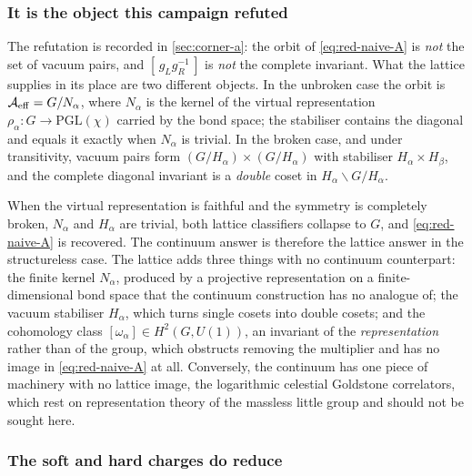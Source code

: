 \subsubsection*{It is the object this campaign refuted}

The refutation is recorded in \cref{sec:corner-a}: the orbit of
\eqref{eq:red-naive-A} is \emph{not} the set of vacuum pairs, and
$[\,g_Lg_R^{-1}\,]$ is \emph{not} the complete invariant. What the lattice
supplies in its place are two different objects. In the unbroken case the orbit
is $\mathcal{A}_{\mathrm{eff}}=G/N_\alpha$, where $N_\alpha$ is the kernel of the virtual
representation $\rho_\alpha\colon G\to\mathrm{PGL}(\chi)$ carried by the bond
space; the stabiliser contains the diagonal and equals it exactly when
$N_\alpha$ is trivial. In the broken case, and under transitivity, vacuum pairs
form $(G/H_\alpha)\times(G/H_\alpha)$ with stabiliser $H_\alpha\times H_\beta$,
and the complete diagonal invariant is a \emph{double} coset in
$H_\alpha\backslash G/H_\alpha$.


\begin{observation}
\label{obs:symmetry-agree-part}
When the virtual representation is faithful and the symmetry is completely
broken, $N_\alpha$ and $H_\alpha$ are trivial, both lattice classifiers collapse
to $G$, and \eqref{eq:red-naive-A} is recovered. The continuum answer is
therefore the lattice answer in the structureless case. The lattice adds three
things with no continuum counterpart: the finite kernel $N_\alpha$, produced by
a projective representation on a finite-dimensional bond space that the
continuum construction has no analogue of; the vacuum stabiliser $H_\alpha$,
which turns single cosets into double cosets; and the cohomology class
$[\omega_\alpha]\in H^2(G,U(1))$, an invariant of the \emph{representation}
rather than of the group, which obstructs removing the multiplier and has no
image in \eqref{eq:red-naive-A} at all. Conversely, the continuum has one piece
of machinery with no lattice image, the logarithmic celestial Goldstone
correlators, which rest on representation theory of the massless little group
and should not be sought here.
\end{observation}

\subsubsection*{The soft and hard charges do reduce}

